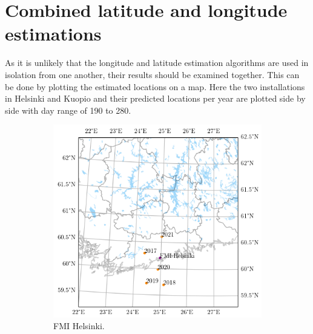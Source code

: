 \newpage
\section{Combined latitude and longitude estimations}
As it is unlikely that the longitude and latitude estimation algorithms are used in isolation from one another, their results should be examined together. This can be done by plotting the estimated locations on a map. Here the two installations in Helsinki and Kuopio and their predicted locations per year are plotted side by side with day range of 190 to 280.

\begin{figure}[h]
	
     \centering
     \begin{subfigure}[b]{0.45\textwidth}
         \centering
         \includegraphics[width=\textwidth]{pics/geolocationmap2}
         \caption{FMI Helsinki.}
         \label{fig_geolocationhelsinki}
     \end{subfigure}
     \hfill
     \begin{subfigure}[b]{0.45\textwidth}
         \centering

\end{subfigure}
\end{figure}
